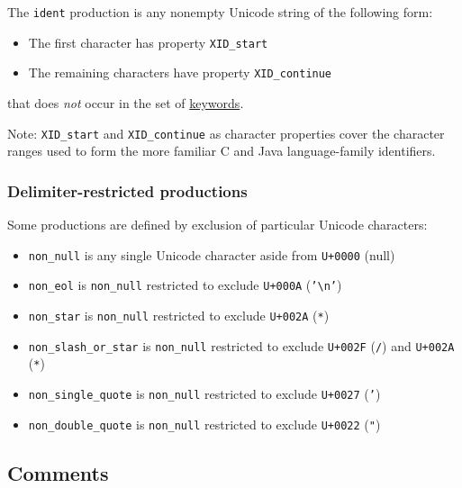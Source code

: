 \documentclass[]{article}
\begin{document}
The \texttt{ident} production is any nonempty Unicode string of the
following form:

\begin{itemize}
\itemsep1pt\parskip0pt
\item
  The first character has property \texttt{XID\_start}
\item
  The remaining characters have property \texttt{XID\_continue}
\end{itemize}

that does \emph{not} occur in the set of \hyperref[keywords]{keywords}.

Note: \texttt{XID\_start} and \texttt{XID\_continue} as character
properties cover the character ranges used to form the more familiar C
and Java language-family identifiers.

\subsubsection{Delimiter-restricted
productions}\label{delimiter-restricted-productions}

Some productions are defined by exclusion of particular Unicode
characters:

\begin{itemize}
\itemsep1pt\parskip0pt
\item
  \texttt{non\_null} is any single Unicode character aside from
  \texttt{U+0000} (null)
\item
  \texttt{non\_eol} is \texttt{non\_null} restricted to exclude
  \texttt{U+000A} (\texttt{'\textbackslash{}n'})
\item
  \texttt{non\_star} is \texttt{non\_null} restricted to exclude
  \texttt{U+002A} (\texttt{*})
\item
  \texttt{non\_slash\_or\_star} is \texttt{non\_null} restricted to
  exclude \texttt{U+002F} (\texttt{/}) and \texttt{U+002A} (\texttt{*})
\item
  \texttt{non\_single\_quote} is \texttt{non\_null} restricted to
  exclude \texttt{U+0027} (\texttt{'})
\item
  \texttt{non\_double\_quote} is \texttt{non\_null} restricted to
  exclude \texttt{U+0022} (\texttt{"})
\end{itemize}

\subsection{Comments}\label{comments}
\end{document}
